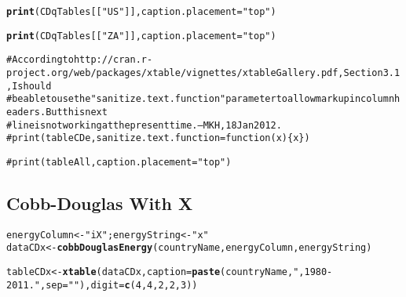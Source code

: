 \documentclass[preprint,authoryear,12pt]{elsarticle}\usepackage{graphicx, color}
\makeatletter
\newcommand{\hlfunctioncall}[1]{\textcolor[rgb]{0.501960784313725,0,0.329411764705882}{\textbf{#1}}}%
\newcommand{\hlstring}[1]{\textcolor[rgb]{0.6,0.6,1}{#1}}%
\newcommand{\hlcomment}[1]{\textcolor[rgb]{0.180392156862745,0.6,0.341176470588235}{#1}}%
\newenvironment{kframe}{%
 \def\at@end@of@kframe{}%
 \ifinner\ifhmode%
  \def\at@end@of@kframe{\end{minipage}}%
  \begin{minipage}{\columnwidth}%
 \fi\fi%
 \def\FrameCommand##1{\hskip\@totalleftmargin \hskip-\fboxsep
 \colorbox{shadecolor}{##1}\hskip-\fboxsep
     \hskip-\linewidth \hskip-\@totalleftmargin \hskip\columnwidth}%
 \MakeFramed {\advance\hsize-\width
   \@totalleftmargin\z@ \linewidth\hsize
   \@setminipage}}%
 {\par\unskip\endMakeFramed%
 \at@end@of@kframe}
\newenvironment{knitrout}{}{} %
\makeatother
\begin{document}
\begin{kframe}
\begin{alltt}
\hlfunctioncall{print}(CDqTables[[\hlstring{"US"}]], caption.placement=\hlstring{"top"})
\end{alltt}


{\ttfamily\noindent\bfseries\color{errorcolor}{Error: error in evaluating the argument 'x' in selecting a method for function 'print': Error: object 'CDqTables' not found}}\begin{alltt}
\hlfunctioncall{print}(CDqTables[[\hlstring{"ZA"}]], caption.placement=\hlstring{"top"})
\end{alltt}


{\ttfamily\noindent\bfseries\color{errorcolor}{Error: error in evaluating the argument 'x' in selecting a method for function 'print': Error: object 'CDqTables' not found}}\begin{alltt}
\hlcomment{# According to http://cran.r-project.org/web/packages/xtable/vignettes/xtableGallery.pdf, Section 3.1, I should }
\hlcomment{# be able to use the "sanitize.text.function" parameter to allow markup in column headers. But this next}
\hlcomment{# line is not working at the present time. --MKH, 18 Jan 2012.}
\hlcomment{# print(tableCDe, sanitize.text.function = function(x)\{x\})}

\hlcomment{#print(tableAll, caption.placement="top")}
\end{alltt}
\end{kframe}


\subsection{Cobb-Douglas With X}

\begin{knitrout}
\color{fgcolor}\begin{kframe}
\begin{alltt}
energyColumn <- \hlstring{"iX"}; energyString <- \hlstring{"x"}
dataCDx <- \hlfunctioncall{cobbDouglasEnergy}(countryName, energyColumn, energyString)
\end{alltt}


{\ttfamily\noindent\bfseries\color{errorcolor}{Error: could not find function "cobbDouglasEnergy"}}\begin{alltt}
tableCDx <- \hlfunctioncall{xtable}(dataCDx, caption=\hlfunctioncall{paste}(countryName, \hlstring{", 1980-2011."}, sep=\hlstring{""}), digit = \hlfunctioncall{c}(4, 4, 2, 2, 3))
\end{alltt}


{\ttfamily\noindent\bfseries\color{errorcolor}{Error: could not find function "xtable"}}\end{kframe}
\end{knitrout}
\end{document}
